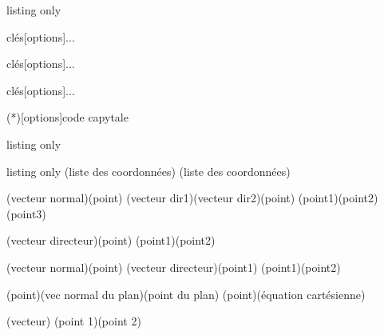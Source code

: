 \documentclass[a4paper,french,11pt]{article}
\begin{document}
\begin{PresCodeTexPL}{listing only}
\begin{TerminalWin}[largeur]{clés}[options]...\end{TerminalWin}
\begin{TerminalUnix}[largeur]{clés}[options]...\end{TerminalUnix}
\begin{TerminalOSX}[largeur]{clés}[options]...\end{TerminalOSX}

\CartoucheCapytale(*)[options]{code capytale}
\end{PresCodeTexPL}

\begin{PresCodeTexPL}{listing only}
\PaveTikz[options]
\TetraedreTikz[options]

\CercleTrigo[clés]
\end{PresCodeTexPL}

\begin{PresCodeTexPL}{listing only}
(liste des coordonnées)
(liste des coordonnées)

\TrouveEqCartPlan[clés](vecteur normal)(point)
\TrouveEqCartPlan[clés](vecteur dir1)(vecteur dir2)(point)
\TrouveEqCartPlan[clés](point1)(point2)(point3)

\TrouveEqParamDroite[clés](vecteur directeur)(point)
\TrouveEqParamDroite[clés](point1)(point2)

\TrouveEqCartDroite[clés](vecteur normal)(point)
(vecteur directeur)(point1)
\TrouveEqCartDroite[clés](point1)(point2)

\TrouveDistancePtPlan(point)(vec normal du plan)(point du plan)
\TrouveDistancePtPlan(point)(équation cartésienne)

\TrouveNorme(vecteur)
\TrouveNorme(point 1)(point 2)
\end{PresCodeTexPL}
\end{document}
